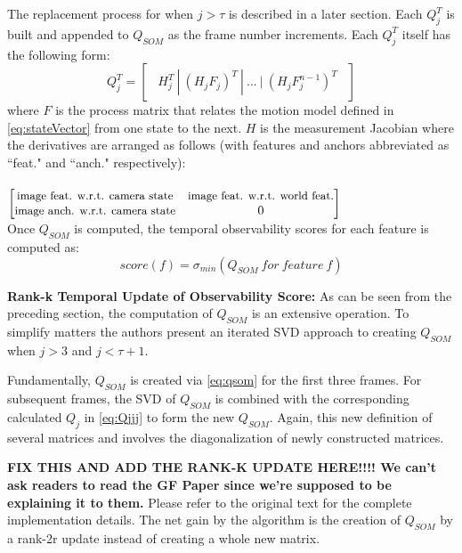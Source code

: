 \documentclass[10pt,twocolumn,letterpaper]{article}
\begin{document}
The replacement process for when $j>\tau$ is described in a later section. Each $Q_j^T$ is built and appended to ${Q}_{SOM}$ as the frame number increments. Each $Q_j^T$ itself has the following form: 
\begin{equation} \label{eq:Qjjj}
Q_j^T = \begin{bmatrix} \ \ H_j^T \ | \ (H_j F_j)^T \ | \ ... \ | \ (H_j F_j^{n-1})^T  \ \ \end{bmatrix}
\end{equation}
where $F$ is the process matrix that relates the motion model defined in \eqref{eq:stateVector} 
from one state to the next. $H$ is the measurement Jacobian where the derivatives are arranged as follows (with features and anchors abbreviated as ``feat." and ``anch." respectively):
\\\\
$\begin{bmatrix}
\small{\text{image feat. w.r.t. camera state}}&\small{\text{image feat. w.r.t. world feat.}}\\
\small{\text{image anch. w.r.t. camera state}}&0
\end{bmatrix}$\\

Once $Q_{SOM}$ is computed, the temporal observability scores for each feature is computed as:
\begin{equation} \label{eq:Qjjj}
score(f) = \sigma_{min}(Q_{SOM} \ for \ feature \ f)
\end{equation}

\textbf{Rank-k Temporal Update of Observability Score:} As can be seen from the preceding section, the computation of $Q_{SOM}$ is an extensive operation. To simplify matters the authors present an iterated SVD approach to creating $Q_{SOM}$ when $j>3$  and $j<\tau + 1$. 

Fundamentally, $Q_{SOM}$ is created via \eqref{eq:qsom} 
for the first three frames. For subsequent frames, the SVD of $Q_{SOM}$ is combined with the corresponding calculated ${Q}_{j}$ in \eqref{eq:Qjjj} to form the new $Q_{SOM}$. Again, this new definition of several matrices and involves the diagonalization of newly constructed matrices. 

\textbf{FIX THIS AND ADD THE RANK-K UPDATE HERE!!!! We can't ask readers to read the GF Paper since we're supposed to be explaining it to them.}
Please refer to the original text for the complete implementation details. The net gain by the algorithm is the creation of $Q_{SOM}$ by a rank-2r update instead of creating a whole new matrix. 
\end{document}
